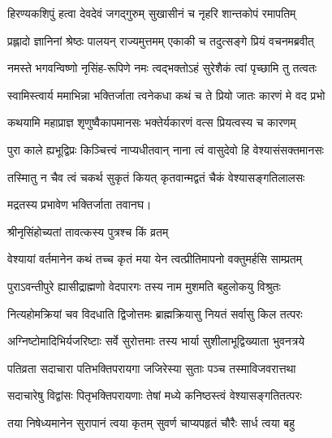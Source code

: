 

\twolineshloka
{हिरण्यकशिपुं हत्वा देवदेवं जगद्गुरुम्}
{सुखासीनं च नृहरि शान्तकोपं रमापतिम्} %

\twolineshloka
{प्रह्लादो ज्ञानिनां श्रेष्ठः पालयन् राज्यमुत्तमम्}
{एकाकी च तदुत्सङ्गे प्रियं वचनमब्रवीत्} %


\twolineshloka
{नमस्ते भगवन्विष्णो नृसिंह-रूपिणे नमः}
{त्वद्भक्तोऽहं सुरेशैकं त्वां पृच्छामि तु तत्वतः} %

\twolineshloka
{स्वामिस्त्वार्य ममाभिन्ना भक्तिर्जाता त्वनेकधा}
{कथं च ते प्रियो जातः कारणं मे वद प्रभो} %


\twolineshloka
{कथयामि महाप्राज्ञ शृणुष्वैकापमानसः}
{भक्तेर्यकारणं वत्स प्रियत्वस्य च कारणम्} %

\twolineshloka
{पुरा काले ह्यभूद्विप्रः किञ्चित्त्वं नाप्यधीतवान्}
{नाना त्वं वासुदेवो हि वेश्यासंसक्तमानसः} %


\twolineshloka
{तस्मिातु न चैव त्वं चकर्थ सुकृतं कियत्}
{कृतवान्मद्वतं चैकं वेश्यासङ्गतिलालसः} %


{मद्रतस्य प्रभावेण भक्तिर्जाता तवानघ।}


\onelineshloka
{श्रीनृसिंहोच्यतां तावत्कस्य पुत्रश्च किं व्रतम्} %

\twolineshloka
{वेश्यायां वर्तमानेन कथं तच्च कृतं मया}
{येन त्वत्प्रीतिमापनो वक्तुमर्हसि साम्प्रतम्} %


\twolineshloka
{पुराऽवन्तीपुरे ह्यासीद्राह्मणो वेदपारगः}
{तस्य नाम मुशमति बहुलोकयु विश्रुतः} %

\twolineshloka
{नित्यहोमक्रियां चव विदधाति द्विजोत्तमः}
{ब्राह्मक्रियासु नियतं सर्वासु किल तत्परः} %

\twolineshloka
{अग्निष्टोमादिभिर्यजरिष्टाः सर्वे सुरोत्तमाः}
{तस्य भार्या सुशीलाभूद्विख्याता भुवनत्रये} %

\twolineshloka
{पतिव्रता सदाचारा पतिभक्तिपरायगा}
{जजिरेस्या सुताः पञ्च तस्माविजवरात्तथा} %

\twolineshloka
{सदाचारेषु विद्वांसः पितृभक्तिपरायणाः}
{तेषां मध्ये कनिष्ठस्त्वं वेश्यासङ्गतितत्परः} %

\twolineshloka
{तया निषेध्यमानेन सुरापानं त्वया कृतम्}
{सुवर्ण चाप्यपहृतं चौरैः सार्ध त्वया बहु} %

